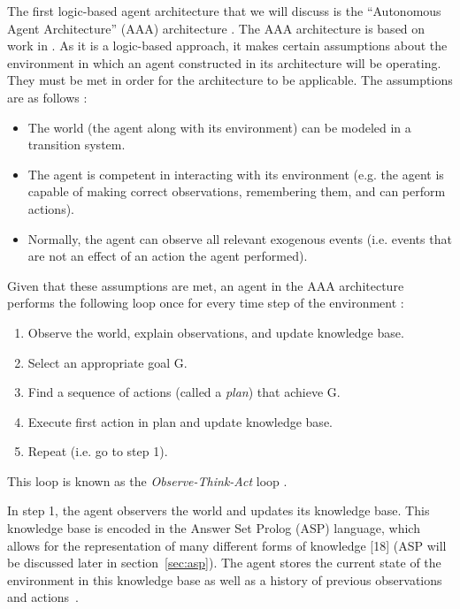 The first logic-based agent architecture that we will discuss is the ``Autonomous Agent Architecture'' (AAA) architecture \cite{balduccini_aaa_2008}.
The AAA architecture is based on work in \cite{baral_reasoning_2000,balduccini_diagnostic_2003, balduccini_answer_2006,balduccini_learning_2007}.
As it is a logic-based approach, it makes certain assumptions about the environment in which an agent constructed in its architecture will be operating.
They must be met in order for the architecture to be applicable.
The assumptions are as follows \cite{balduccini_aaa_2008}:

\begin{itemize}
    \item The world (the agent along with its environment) can be modeled in a transition system.
    \item The agent is competent in interacting with its environment (e.g. the agent is capable of making correct observations, remembering them, and can perform actions).
    \item Normally, the agent can observe all relevant exogenous events (i.e. events that are not an effect of an action the agent performed).
\end{itemize}

Given that these assumptions are met, an agent in the AAA architecture performs the following loop once for every time step of the environment \cite{balduccini_aaa_2008}:

\begin{enumerate}
    \item Observe the world, explain observations, and update knowledge base.
    \item Select an appropriate goal G.
    \item Find a sequence of actions (called a \textit{plan}) that achieve G.
    \item Execute first action in plan and update knowledge base.
    \item Repeat (i.e. go to step 1).
\end{enumerate}

This loop is known as the \textit{Observe-Think-Act} loop \cite{balduccini_aaa_2008}.

In step 1, the agent observers the world and updates its knowledge base.
This knowledge base is encoded in the Answer Set Prolog (ASP) language, which allows for the representation of many different forms of knowledge [18] (ASP will be discussed later in section~\ref{sec:asp}).
The agent stores the current state of the environment in this knowledge base as well as a history of previous observations and actions~\cite{balduccini_aaa_2008}.

